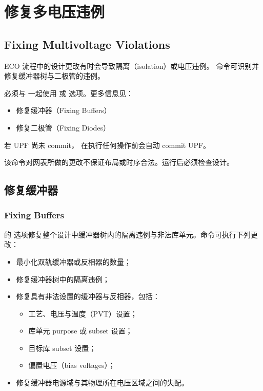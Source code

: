 \section{修复多电压违例}
\subsection*{Fixing Multivoltage Violations}

ECO 流程中的设计更改有时会导致隔离（isolation）或电压违例。 命令可识别并修复缓冲器树与二极管的违例。

必须与  一起使用  或  选项。更多信息见：
\begin{itemize}
  \item 修复缓冲器（Fixing Buffers）
  \item 修复二极管（Fixing Diodes）
\end{itemize}

若 UPF 尚未 commit， 在执行任何操作前会自动 commit UPF。

该命令对网表所做的更改不保证布局或时序合法。运行后必须检查设计。

\subsection{修复缓冲器}
\subsubsection*{Fixing Buffers}

 的  选项修复整个设计中缓冲器树内的隔离违例与非法库单元。命令可执行下列更改：
\begin{itemize}
  \item 最小化双轨缓冲器或反相器的数量；
  \item 修复缓冲器树中的隔离违例；
  \item 修复具有非法设置的缓冲器与反相器，包括：
  \begin{itemize}
    \item 工艺、电压与温度（PVT）设置；
    \item 库单元 purpose 或 subset 设置；
    \item 目标库 subset 设置；
    \item 偏置电压（bias voltages）；
  \end{itemize}
  \item 修复缓冲器电源域与其物理所在电压区域之间的失配。
\end{itemize}

